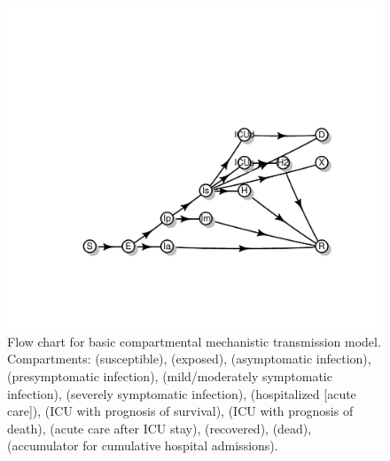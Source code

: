 \documentclass[12pt]{article}\usepackage[]{graphicx}\usepackage[]{color}
\begin{document}
\begin{figure}
\vspace{-5cm} %
\color{fgcolor}
\includegraphics[width=\maxwidth]{figure/flowchartdiagram-1.pdf} 
\vspace{-3cm} %
\caption{Flow chart for basic compartmental mechanistic transmission
  model. Compartments:  (susceptible),  (exposed),
   (asymptomatic infection),  (presymptomatic
  infection),  (mild/moderately symptomatic infection),
   (severely symptomatic infection),  (hospitalized
  [acute care]),  (ICU with prognosis of survival),
   (ICU with prognosis of death),  (acute care
  after ICU stay),  (recovered),  (dead), 
  (accumulator for cumulative hospital admissions).   }
\label{fig:flowchart}
\end{figure}
\end{document}
